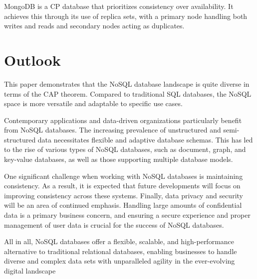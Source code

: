 MongoDB is a \ac{CP} database that prioritizes consistency over availability. It achieves this through its use of replica sets, with a primary node handling both writes and reads and secondary nodes acting as duplicates. 
\section*{Outlook}
This paper demonstrates that the \ac{NoSQL} database landscape is quite diverse in terms of the \ac{CAP} theorem. Compared to traditional SQL databases, the \ac{NoSQL} space is more versatile and adaptable to specific use cases. 

Contemporary applications and data-driven organizations particularly benefit from \ac{NoSQL} databases. The increasing prevalence of unstructured and semi-structured data necessitates flexible and adaptive database schemas. This has led to the rise of various types of \ac{NoSQL} databases, such as document, graph, and key-value databases, as well as those supporting multiple database models.

One significant challenge when working with \ac{NoSQL} databases is maintaining consistency. As a result, it is expected that future developments will focus on improving consistency across these systems. Finally, data privacy and security will be an area of continued emphasis. Handling large amounts of confidential data is a primary business concern, and ensuring a secure experience and proper management of user data is crucial for the success of \ac{NoSQL} databases.

All in all, \ac{NoSQL} databases offer a flexible, scalable, and high-performance alternative to traditional relational databases, enabling businesses to handle diverse and complex data sets with unparalleled agility in the ever-evolving digital landscape
